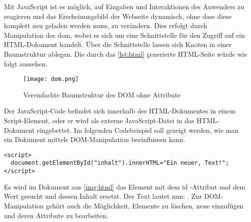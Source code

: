 Mit JavaScript ist es möglich, auf Eingaben und Interaktionen des Anwenders zu reagieren und das Erscheinungsbild der Webseite dynamisch, ohne dass diese komplett neu geladen werden muss, zu verändern. Dies erfolgt durch Manipulation des \ac{dom}, wobei es sich um eine Schnittstelle für den Zugriff auf ein HTML-Dokument handelt. Über die Schnittstelle lassen sich Knoten in einer Baumstruktur ablegen. Die durch das \autoref{lst:html} generierte HTML-Seite würde wie folgt aussehen.
\begin{figure}[H]
    \begin{center}
        \texttt{[image: dom.png]}
        \caption{Vereinfachte Baumstruktur des DOM ohne Attribute}
        \label{img:dom}
    \end{center}
\end{figure}

Der JavaScript-Code befindet sich innerhalb des HTML-Dokumentes in einem Script-Element, oder er wird als externe JavaScript-Datei in das HTML-Dokument eingebettet. Im folgenden Codebeispiel soll gezeigt werden, wie man ein Dokument mittels DOM-Manipulation beeinflussen kann.

\begin{lstlisting}[style=htmlcssjs, caption=Ein JavaScript Beispiel, label=lst:javascript]
<script>
  document.getElementById("inhalt").innerHTML="Ein neuer, Text!";
</script>
\end{lstlisting}

Es wird im Dokument aus \autoref{img:html} das Element mit dem id -Attribut und dem Wert  gesucht und dessen Inhalt ersetzt. Der Text  lautet nun: . Zur DOM-Manipulation gehört auch die Möglichkeit, Elemente zu löschen, neue einzufügen und deren Attribute zu bearbeiten.\\